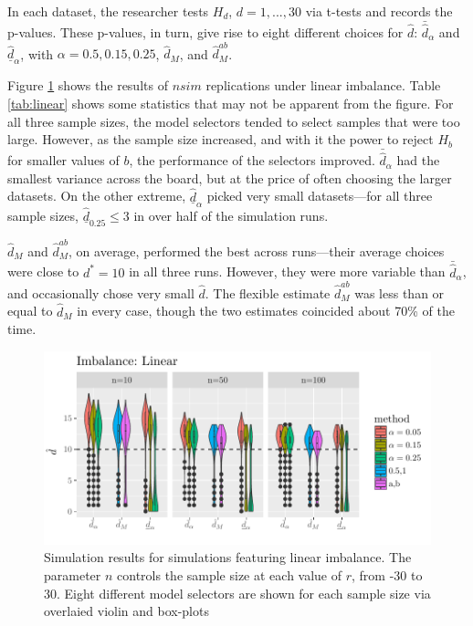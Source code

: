 \documentclass[12pt]{article}\usepackage[]{graphicx}\usepackage[]{color}
\makeatletter
\def\maxwidth{ %
  \ifdim\Gin@nat@width>\linewidth
    \linewidth
  \else
    \Gin@nat@width
  \fi
}
\newcommand{\dalphaU}{\bar{\hat{d}}_\alpha}
\newcommand{\dalphaB}{\underline{\hat{d}}_\alpha}
\newcommand{\dstar}{d^*}
\newcommand{\dhatB}{\underline{\hat{d}}}
\newcommand{\dhatm}{\hat{d}_M}
\newcommand{\dhatmab}{\hat{d}^{ab}_M}
\makeatother
\begin{document}
In each dataset, the researcher tests $H_d$, $d=1,...,30$ via t-tests
and records the p-values.
These p-values, in turn, give rise to eight different choices for
$\hat{d}$: $\dalphaU$ and $\dalphaB$, with $\alpha=0.5,0.15,0.25$,
$\dhatm$, and $\dhatmab$.

Figure \ref{fig:linImb} shows the results of $nsim$ replications
under linear imbalance.
Table \ref{tab:linear} shows some statistics that may not be apparent
from the figure.
For all three sample sizes, the model selectors tended to select
samples that were too large.
However, as the sample size increased, and with it the power to reject
$H_b$ for smaller values of $b$, the performance of the selectors
improved.
$\dalphaU$ had the smallest
variance across the board, but at the
price of often choosing the larger datasets.
On the other extreme, $\dalphaB$ picked very small datasets---for all
three sample sizes, $\dhatB_{0.25}\le 3$ in over half of the
simulation runs.

$\dhatm$ and $\dhatmab$, on average, performed the best across
runs---their average choices were close to $\dstar=10$ in all three
runs.
However, they were more variable than $\dalphaU$, and occasionally
chose very small $\hat{d}$.
The flexible estimate $\dhatmab$ was less than or equal to $\dhatm$ in
every case, though the two estimates coincided about
70\% of the time.



\begin{figure}

\includegraphics[width=\maxwidth]{figure/linearImbalance-1} 

\caption{Simulation results for simulations featuring linear
  imbalance. The parameter $n$ controls the sample size at each value
  of $r$, from -30 to 30. Eight different model selectors are shown
  for each sample size via overlaied violin and box-plots}
\label{fig:linImb}
\end{figure}
\end{document}
